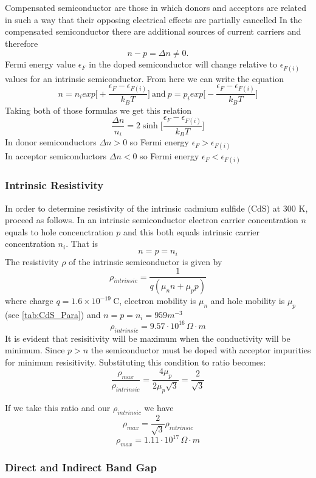 Compensated semiconductor are those in which donors and acceptors are related in such a way that their opposing electrical effects are partially cancelled
In the compensated semiconductor there are additional sources of current carriers and therefore
$$
n - p = \Delta n \neq 0.
$$
Fermi energy value $\epsilon_F$ in the doped semiconductor will change relative to $\epsilon_{F(i)}$ values for an intrinsic semiconductor. From here we can write the equation
$$
n = n_i exp\bigg[+\frac{\epsilon_F - \epsilon_{F(i)}}{k_B T}\bigg] \ \mathrm{and} \
p = p_i exp\bigg[-\frac{\epsilon_F - \epsilon_{F(i)}}{k_B T}\bigg]
$$
Taking both of those formulas we get this relation
\begin{equation}
\frac{\Delta n}{n_i} = 2\sinh{\bigg[\frac{\epsilon_F - \epsilon_{F(i)}}{k_B T}\bigg]}
\end{equation}
In donor semiconductors $\Delta n > 0$ so Fermi energy $\epsilon_F > \epsilon_{F(i)}$ \\
In acceptor semiconductors $\Delta n < 0$ so Fermi energy $\epsilon_F < \epsilon_{F(i)}$

\subsubsection*{Intrinsic Resistivity}
In order to determine resistivity of the intrinsic cadmium sulfide (CdS) at 300 K, proceed as follows. In an intrinsic semiconductor electron carrier concentration $n$ equals to hole concenctration $p$ and this both equals intrinsic carrier concentration $n_i$. That is
$$
n = p = n_i 
$$
The resistivity $\rho$ of the intrinsic semiconductor is given by
$$
\rho_{intrinsic} = \frac{1}{q(\mu_nn + \mu_pp)}
$$
where charge $q = 1.6 \times 10^{-19}\ \mathrm{C}$, electron mobility is $\mu_n$ and hole mobility is $\mu_p$ (see \autoref{tab:CdS_Para})
and $n=p=n_i= 959 m^{-3}$
$$
\rho_{intrinsic} = 9.57 \cdot 10^{16} \, \Omega \cdot m
$$
It is evident that resisitivity will be maximum when the conductivity will be minimum. Since $p > n$ the semiconductor must be doped with acceptor impurities for minimum resisitivity. Substituting this condition to ratio becomes:
$$
\frac{\rho_{max}}{\rho_{intrinsic}} = \frac{4 \mu_p}{2\mu_p \sqrt{3}} = \frac{2}{\sqrt{3}}
$$


If we take this ratio and our $\rho_{intrinsic}$ we have
$$
\rho_{max} = \frac{2}{\sqrt{3}} \rho_{intrinsic}
$$
$$
\rho_{max} = 1.11 \cdot 10^{17} \, \Omega \cdot m
$$

\subsubsection*{Direct and Indirect Band Gap}

